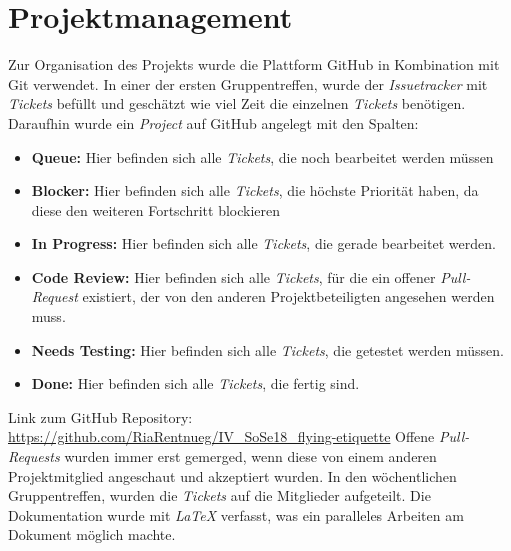\documentclass{mi-seminar}
\begin{document}
\section{Projektmanagement}
Zur Organisation des Projekts wurde die Plattform GitHub in Kombination mit Git verwendet. In einer der ersten Gruppentreffen, wurde der \textit{Issuetracker} mit \textit{Tickets} befüllt und geschätzt wie viel Zeit die einzelnen \textit{Tickets} benötigen. 
Daraufhin wurde ein \textit{Project} auf GitHub angelegt mit den Spalten:
\begin{itemize}
\item \textbf{Queue: } Hier befinden sich alle \textit{Tickets}, die noch bearbeitet werden müssen
\item \textbf{Blocker: } Hier befinden sich alle \textit{Tickets}, die höchste Priorität haben, da diese den weiteren Fortschritt blockieren
\item \textbf{In Progress: } Hier befinden sich alle \textit{Tickets}, die gerade bearbeitet werden.
\item \textbf{Code Review: } Hier befinden sich alle \textit{Tickets}, für die ein offener \textit{Pull-Request} existiert, der von den anderen Projektbeteiligten angesehen werden muss.
\item \textbf{Needs Testing: } Hier befinden sich alle \textit{Tickets}, die getestet werden müssen.
\item \textbf{Done: } Hier befinden sich alle \textit{Tickets}, die fertig sind.
\newline \newline
\end{itemize}
Link zum GitHub Repository:\newline
\href{https://github.com/RiaRentnueg/IV_SoSe18_flying-etiquette}{https://github.com/RiaRentnueg/IV\_SoSe18\_flying-etiquette}
\linebreak \newline
Offene \textit{Pull-Requests} wurden immer erst gemerged, wenn diese von einem anderen Projektmitglied angeschaut und akzeptiert wurden. 
In den wöchentlichen Gruppentreffen, wurden die \textit{Tickets}
auf die Mitglieder aufgeteilt. \newline
Die Dokumentation wurde mit \textit{LaTeX} verfasst, was ein paralleles Arbeiten am Dokument möglich machte.
\end{document}
